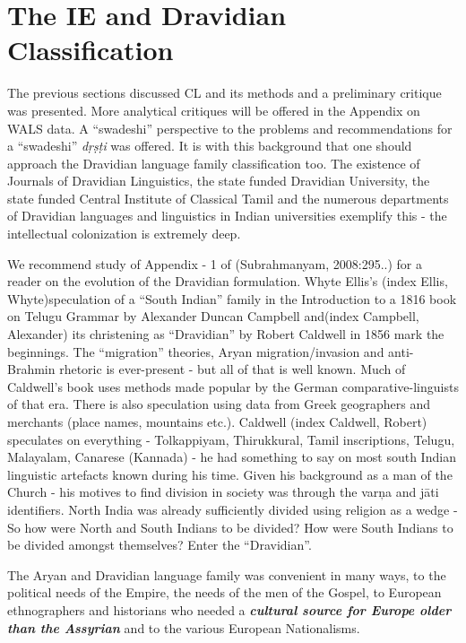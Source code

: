 \section*{The IE and Dravidian Classification}

The previous sections discussed CL and its methods and a preliminary critique was presented. More analytical critiques will be offered in the Appendix on WALS data. A “swadeshi” perspective to the problems and recommendations for a “swadeshi” \textit{dṛṣṭi} was offered. It is with this background that one should approach the Dravidian language family classification too. The existence of Journals of Dravidian Linguistics, the state funded Dravidian University, the state funded Central Institute of Classical Tamil and the numerous departments of Dravidian languages and linguistics in Indian universities exemplify this - the intellectual colonization is extremely deep.

We recommend study of Appendix - 1 of (Subrahmanyam, 2008:295..) for a reader on the evolution of the Dravidian formulation. Whyte Ellis’s (index Ellis, Whyte)speculation of a “South Indian” family in the Introduction to a 1816 book on Telugu Grammar by Alexander Duncan Campbell and(index Campbell, Alexander) its christening as “Dravidian” by Robert Caldwell in 1856 mark the beginnings. The “migration” theories, Aryan migration/invasion and anti-Brahmin rhetoric is ever-present - but all of that is well known. Much of Caldwell’s book uses methods made popular by the German comparative-linguists of that era. There is also speculation using data from Greek geographers and merchants (place names, mountains etc.). Caldwell (index Caldwell, Robert) speculates on everything - Tolkappiyam, Thirukkural, Tamil inscriptions, Telugu, Malayalam, Canarese (Kannada) - he had something to say on most south Indian linguistic artefacts known during his time. Given his background as a man of the Church - his motives to find division in society was through the varņa and jāti identifiers. North India was already sufficiently divided using religion as a wedge - So how were North and South Indians to be divided? How were South Indians to be divided amongst themselves? Enter the “Dravidian”.

The Aryan and Dravidian language family was convenient in many ways, to the political needs of the Empire, the needs of the men of the Gospel, to European ethnographers and historians who needed a \textbf{\textit{cultural source for Europe older than the Assyrian}} and to the various European Nationalisms.

